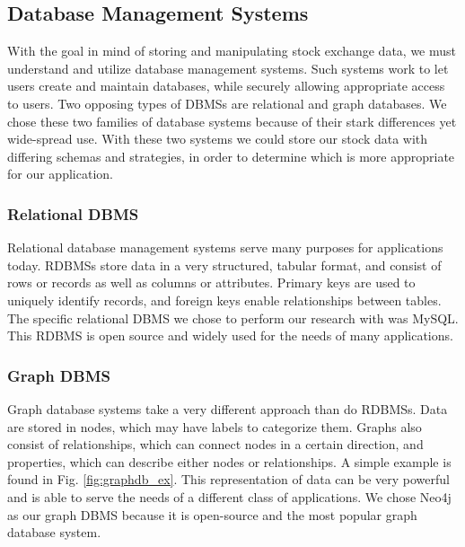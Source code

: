 \documentclass{IEEEtran}
\begin{document}
\subsection{Database Management Systems}

With the goal in mind of storing and manipulating stock exchange data, we must understand and utilize database management systems. Such systems work to let users create and maintain databases, while securely allowing appropriate access to users. Two opposing types of DBMSs are relational and graph databases. We chose these two families of database systems because of their stark differences yet wide-spread use. With these two systems we could store our stock data with differing schemas and strategies, in order to determine which is more appropriate for our application.

\subsubsection{Relational DBMS}

Relational database management systems serve many purposes for applications today. RDBMSs store data in a very structured, tabular format, and consist of rows or records as well as columns or attributes. Primary keys are used to uniquely identify records, and foreign keys enable relationships between tables. The specific relational DBMS we chose to perform our research with was MySQL. This RDBMS is open source and widely used for the needs of many applications.  

\subsubsection{Graph DBMS}

Graph database systems take a very different approach than do RDBMSs. Data are stored in nodes, which may have labels to categorize them. Graphs also consist of relationships, which can connect nodes in a certain direction, and properties, which can describe either nodes or relationships. A simple example is found in Fig. \ref{fig:graphdb_ex}. This representation of data can be very powerful and is able to serve the needs of a different class of applications. We chose Neo4j as our graph DBMS because it is open-source and the most popular graph database system.  
\end{document}
